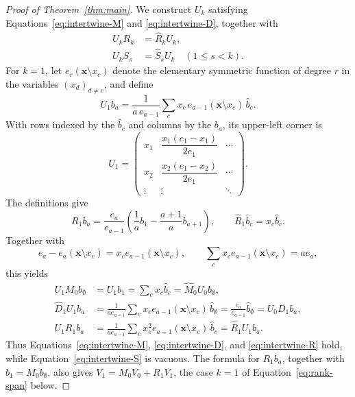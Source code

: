 \documentclass[12pt]{article}
\theoremstyle{plain}
\theoremstyle{definition}
\theoremstyle{remark}
\begin{document}
\begin{proof}[Proof of Theorem~\ref{thm:main}]
We construct $U_k$ satisfying
Equations~\eqref{eq:intertwine-M} and \eqref{eq:intertwine-D}, together with
\begin{align}
U_kR_k&=\hat R_kU_k,\tag{R}\label{eq:intertwine-R}\\
U_kS_s&=\hat S_sU_k\quad(1\le s<k).\tag{S}\label{eq:intertwine-S}
\end{align}
For $k=1$, let $e_r(\bm x\setminus x_c)$ denote the elementary symmetric function of degree $r$ in the variables $(x_d)_{d\ne c}$, and define
\[
U_1b_a=\frac1{a\,e_{a-1}}\sum_cx_c\,e_{a-1}(\bm x\setminus x_c)\,\hat b_c.
\]
With rows indexed by the $\hat b_c$ and columns by the $b_a$, its upper-left corner is
\[
U_1=
\begin{pmatrix}
x_1 & \dfrac{x_1(e_1-x_1)}{2e_1} & \cdots\\
x_2 & \dfrac{x_2(e_1-x_2)}{2e_1} & \cdots\\
\vdots & \vdots & \ddots
\end{pmatrix}.
\]
The definitions give
\[
R_1b_a=\frac{e_a}{e_{a-1}}\left(\frac1a b_1-\frac{a+1}{a}b_{a+1}\right),
\qquad \hat R_1\hat b_c=x_c\hat b_c.
\]
Together with
\[
e_a-e_a(\bm x\setminus x_c)=x_ce_{a-1}(\bm x\setminus x_c),
\qquad \sum_cx_ce_{a-1}(\bm x\setminus x_c)=ae_a,
\]
this yields
\begin{align*}
U_1M_0b_{\emptyset}
 &=U_1b_1=\sum_cx_c\hat b_c=\hat M_0U_0b_{\emptyset},\\
\hat D_1U_1b_a
 &=\frac1{a e_{a-1}}\sum_cx_ce_{a-1}(\bm x\setminus x_c)\,\hat b_{\emptyset}
 =\frac{e_a}{e_{a-1}}\hat b_{\emptyset}=U_0D_1b_a,\\
U_1R_1b_a
 &=\frac1{a e_{a-1}}\sum_cx_c^2e_{a-1}(\bm x\setminus x_c)\,\hat b_c
 =\hat R_1U_1b_a.
\end{align*}
Thus Equations~\eqref{eq:intertwine-M}, \eqref{eq:intertwine-D}, and
\eqref{eq:intertwine-R} hold, while Equation~\eqref{eq:intertwine-S} is
vacuous. The formula for $R_1b_a$, together with $b_1=M_0b_{\emptyset}$,
also gives $V_1=M_0V_0+R_1V_1$, the case $k=1$ of Equation~\eqref{eq:rank-span} below.


\end{proof}
\end{document}
